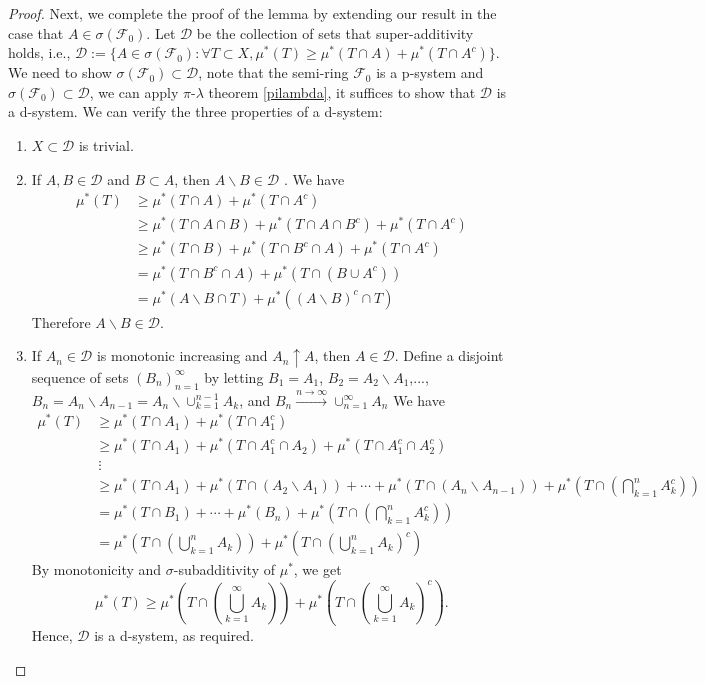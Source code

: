 \documentclass[11pt,english]{smfart}
\newcommand{\mc}{\mathcal}
\begin{document}
\begin{proof}
    Next, we complete the proof of the lemma by extending our result in the case that \underline{$A\in \sigma(\mc{F}_0)$}. Let $\mc{D}$ be the collection of sets that super-additivity holds, i.e., $\mc{D}:= \{A\in \sigma(\mc{F}_0): \forall T \subset X, \mu^*(T) \geq  \mu^* ( T\cap A) + \mu^*(T\cap A^c)\}$. We need to show $\sigma(\mc{F}_0) \subset \mc{D}$, note that the semi-ring $\mc{F}_0$ is a p-system and $\sigma(\mc{F}_0) \subset \mc{D}$, we can apply $\pi$-$\lambda$ theorem \ref{pilambda}, it suffices to show that $\mc{D}$ is a d-system. We can verify the three properties of a d-system:
    \begin{enumerate}
        \item $X\subset \mc{D}$ is trivial.
        \item If $A,B\in \mc{D}$ and $B \subset A$, then $A\backslash B \in \mc{D}$ . We have \begin{align*}
            \mu^*(T) &\geq \mu^*(T\cap A) + \mu^*(T\cap A^c) \\
            &\geq \mu^*(T\cap A \cap B) + \mu^*(T\cap A \cap B^c) + \mu^*(T\cap A^c) \\
            &\geq \mu^*(T\cap B) + \mu^*(T\cap B^c \cap A) + \mu^*(T\cap A^c)\\
            &= \mu^*(T\cap B^c \cap A) + \mu^*(T\cap (B\cup A^c)) \\
            &= \mu^*(A\backslash B \cap T) + \mu^*((A\backslash B)^c \cap T)
        \end{align*}
        Therefore $A\backslash B \in \mc{D}$.
        \item If $A_n \in \mc{D}$ is monotonic increasing and $A_n \uparrow A$, then $A\in\mc{D}$. Define a disjoint sequence of sets $(B_n)_{n=1}^\infty$ by letting $B_1 = A_1$, $B_2 = A_2\backslash A_1$,...,$B_n = A_n \backslash A_{n-1} = A_n \backslash \cup_{k=1}^{n-1} A_k$, and $B_n \xrightarrow{n\rightarrow \infty} \cup_{n=1}^\infty A_n$ We have \begin{align*}
            \mu^*(T) &\geq \mu^*(T\cap A_1) + \mu^*(T\cap A_1^c) \\
            &\geq \mu^*(T\cap A_1) + \mu^*(T\cap A_1^c \cap A_2) +\mu^*(T\cap A_1^c \cap A_2^c) \\
            &\ \vdots \\
            &\geq \mu^*(T\cap A_1) + \mu^*(T\cap (A_2\backslash A_1)) + \cdots + \mu^*(T\cap (A_n\backslash A_{n-1})) + \mu^*\left(T\cap \left(\bigcap_{k=1}^n A_k^c\right) \right) \\
            &= \mu^*(T\cap B_1) + \cdots + \mu^*(B_{n}) + \mu^*\left(T\cap \left(\bigcap_{k=1}^n A_k^c\right) \right)\\
            &= \mu^*\left(T\cap \left(\bigcup_{k=1}^n A_k\right)\right) + \mu^*\left(T\cap \left(\bigcup_{k=1}^n A_k\right) ^c\right)
        \end{align*} By monotonicity and $\sigma$-subadditivity of $\mu^*$, we get $$\mu^*(T)\geq \mu^*\left(T\cap \left(\bigcup_{k=1}^\infty A_k\right)\right) + \mu^*\left(T\cap \left(\bigcup_{k=1}^\infty A_k\right) ^c\right).$$ Hence, $\mc{D}$ is a d-system, as required.
    \end{enumerate}


\end{proof}
\end{document}
